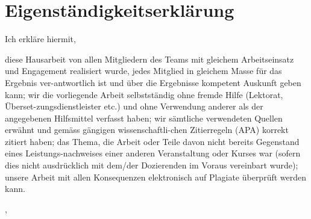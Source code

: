 \section*{Eigenständigkeitserklärung}
Ich erkläre hiermit,
\begin{itemize}
\dass diese Hausarbeit von allen Mitgliedern des Teams mit gleichem Arbeitseinsatz und Engagement realisiert wurde, jedes Mitglied in gleichem Masse für das Ergebnis ver-antwortlich ist und über die Ergebnisse kompetent Auskunft geben kann;
\dass wir die vorliegende Arbeit selbstständig ohne fremde Hilfe (Lektorat, Überset-zungsdienstleister etc.) und ohne Verwendung anderer als der angegebenen Hilfsmittel verfasst haben;
\dass wir sämtliche verwendeten Quellen erwähnt und gemäss gängigen wissenschaftli-chen Zitierregeln (APA) korrekt zitiert haben;
\dass das Thema, die Arbeit oder Teile davon nicht bereits Gegenstand eines Leistungs-nachweises einer anderen Veranstaltung oder Kurses war (sofern dies nicht ausdrücklich mit dem/der Dozierenden im Voraus vereinbart wurde);
\dass unsere Arbeit mit allen Konsequenzen elektronisch auf Plagiate überprüft werden kann.
\end{itemize}
\vspace{1cm}
\hfill \theCity, \theDate
\\
\vspace{1.5cm}


\hfill \theAuthor
\thispagestyle{empty}
